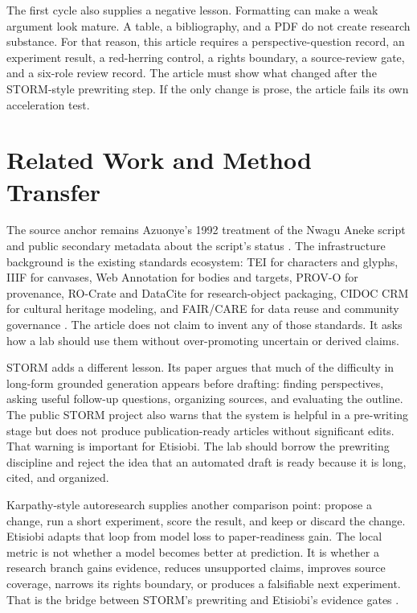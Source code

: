 \documentclass[sigconf,nonacm]{acmart}
\begin{document}
The first cycle also supplies a negative lesson. Formatting can make a weak
argument look mature. A table, a bibliography, and a PDF do not create research
substance. For that reason, this article requires a perspective-question record, an
experiment result, a red-herring control, a rights boundary, a source-review gate,
and a six-role review record. The article must show what changed after the
STORM-style prewriting step. If the only change is prose, the article fails its
own acceleration test.

\section{Related Work and Method Transfer}
The source anchor remains Azuonye's 1992 treatment of the Nwagu Aneke script and
public secondary metadata about the script's status \cite{azuonye1992,omniglotNwagu,scriptSourceNwagu,unicodeAfricanScripts2023}.
The infrastructure background is the existing standards ecosystem: TEI for
characters and glyphs, IIIF for canvases, Web Annotation for bodies and targets,
PROV-O for provenance, RO-Crate and DataCite for research-object packaging,
CIDOC CRM for cultural heritage modeling, and FAIR/CARE for data reuse and
community governance \cite{teiP5Glyphs,iiifPresentation3,w3cAnnotationModel,w3cProvO,rocrate12,cidocCrm,datacite45,wilkinson2016fair,carroll2020care}. The article does not claim to invent
any of those standards. It asks how a lab should use them without over-promoting
uncertain or derived claims.

STORM adds a different lesson. Its paper argues that much of the difficulty in
long-form grounded generation appears before drafting: finding perspectives,
asking useful follow-up questions, organizing sources, and evaluating the
outline. The public STORM project also warns that the system is helpful in a
pre-writing stage but does not produce publication-ready articles without
significant edits. That warning is important for Etisiobi. The lab should borrow
the prewriting discipline and reject the idea that an automated draft is ready
because it is long, cited, and organized.

Karpathy-style autoresearch supplies another comparison point: propose a change,
run a short experiment, score the result, and keep or discard the change. Etisiobi
adapts that loop from model loss to paper-readiness gain. The local metric is
not whether a model becomes better at prediction. It is whether a research
branch gains evidence, reduces unsupported claims, improves source coverage,
narrows its rights boundary, or produces a falsifiable next experiment. That is
the bridge between STORM's prewriting and Etisiobi's evidence gates
\cite{karpathyAutoresearch,shao2024storm,jiang2024costorm}.
\end{document}
